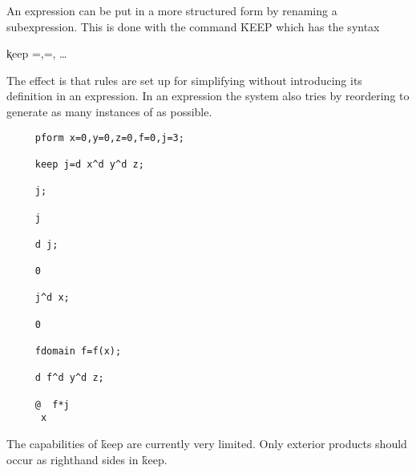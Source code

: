 An expression can be put in a more structured form by renaming a
subexpression.  This is done with the command \f{KEEP} which
has the syntax \label{KEEP}
\hypertarget{command:KEEP}{}

\hspace*{2em} \k{keep}
=,=, \ldots

The effect is that rules are set up for simplifying  without
introducing its definition in an expression. In an expression the system
also tries by reordering to generate as many instances of  as
possible.

\example{}

\begin{verbatim}
     pform x=0,y=0,z=0,f=0,j=3;

     keep j=d x^d y^d z;

     j;

     j

     d j;

     0

     j^d x;

     0

     fdomain f=f(x);

     d f^d y^d z;

     @  f*j
      x
\end{verbatim}

The capabilities of \f{keep} are currently very limited.  Only exterior
products should occur as righthand sides in \f{keep}.

\pagebreak
